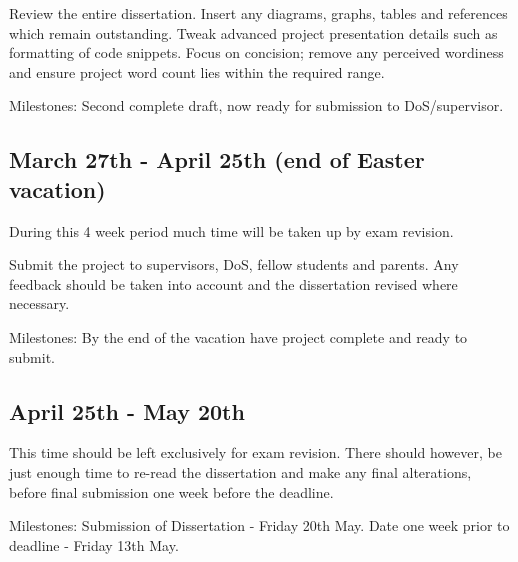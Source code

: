 Review the entire dissertation. Insert any diagrams, graphs, tables and references which remain outstanding. Tweak advanced project presentation details such as formatting of code snippets. Focus on concision; remove any perceived wordiness and ensure project word count lies within the required range.

Milestones: Second complete draft, now ready for submission to DoS/supervisor.

\subsection*{March 27th - April 25th (end of Easter vacation)}

During this 4 week period much time will be taken up by exam revision.

Submit the project to supervisors, DoS, fellow students and parents. Any feedback should be taken into account and the dissertation revised where necessary.

Milestones: By the end of the vacation have project complete and ready to submit.


\subsection*{April 25th - May 20th}

This time should be left exclusively for exam revision. There should however, be just enough time to re-read the dissertation and make any final alterations, before final submission one week before the deadline.

Milestones: Submission of Dissertation - Friday 20th May. Date one week prior to deadline - Friday 13th May.